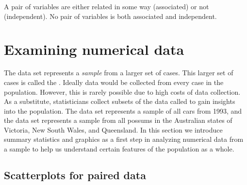 \begin{termBox}{
A pair of variables are either related in some way (associated) or not (independent). No pair of variables is both associated and independent.} %
\end{termBox}



\section{Examining numerical data}
\label{numericalData}

The  data set represents a \emph{sample} from a larger set of cases. This larger set of cases is called the . Ideally data would be collected from every case in the population. However, this is rarely possible due to high costs of data collection. As a substitute, statisticians collect subsets of the data called  to gain insights into the population. The  data set represents a sample of all cars from 1993, and the  data set represents a sample from all possums in the Australian states of Victoria, New South Wales, and Queensland. In this section we introduce summary statistics and graphics as a first step in analyzing numerical data from a sample to help us understand certain features of the population as a whole.

\subsection{Scatterplots for paired data}
\label{scatterPlots}

